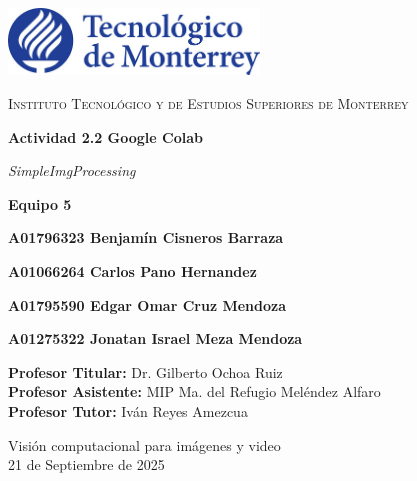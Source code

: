 \documentclass[12pt,letterpaper]{article}
\begin{document}
\begin{titlepage}
  \centering
  \vspace*{0.5cm}
  \includegraphics[width=0.5\textwidth]{logo.jpg}\par
  \vspace{1.2cm}

  {\Large\scshape Instituto Tecnológico y de Estudios Superiores de Monterrey\par}
  \vspace{2.2cm}

  {\huge\bfseries Actividad 2.2 Google Colab\par
   \vspace{0.2cm}
   \emph{SimpleImgProcessing}\par}
  \vspace{2.2cm}

  {\Large\bfseries Equipo 5\par}
  {\normalsize\bfseries A01796323 Benjamín Cisneros Barraza\par}
  {\normalsize\bfseries A01066264 Carlos Pano Hernandez\par}
  {\normalsize\bfseries A01795590 Edgar Omar Cruz Mendoza\par}
  {\normalsize\bfseries A01275322 Jonatan Israel Meza Mendoza\par}
  
  \vspace{1.2cm}

  \begin{flushleft}
    \normalsize \textbf{Profesor Titular:} Dr. Gilberto Ochoa Ruiz\\
    \normalsize \textbf{Profesor Asistente:} MIP Ma. del Refugio Meléndez Alfaro\\
    \normalsize \textbf{Profesor Tutor:} Iván Reyes Amezcua
  \end{flushleft}

  \vfill

  \begin{flushright}
    \normalsize Visión computacional para imágenes y video\\
    \normalsize 21 de Septiembre de 2025
  \end{flushright}
\end{titlepage}
\end{document}
